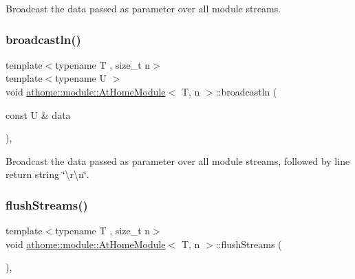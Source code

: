 Broadcast the data passed as parameter over all module streams. \mbox{\label{classathome_1_1module_1_1_at_home_module_a863a9efaa6d10169d1888278cbc70175}} 
\subsubsection{\texorpdfstring{broadcastln()}{broadcastln()}}
{\footnotesize\ttfamily template$<$typename T , size\+\_\+t n$>$ \\
template$<$typename U $>$ \\
void \mbox{\hyperlink{classathome_1_1module_1_1_at_home_module}{athome\+::module\+::\+At\+Home\+Module}}$<$ T, n $>$\+::broadcastln (\begin{DoxyParamCaption}\item[{const U \&}]{data }\end{DoxyParamCaption})\hspace{0.3cm}{\ttfamily [inline]}, {\ttfamily [protected]}}

Broadcast the data passed as parameter over all module streams, followed by line return string \char`\"{}\textbackslash{}r\textbackslash{}n\char`\"{}. \mbox{\label{classathome_1_1module_1_1_at_home_module_ad6e64ed8ff0c2daf0e8bb935b0a8e127}} 
\subsubsection{\texorpdfstring{flush\+Streams()}{flushStreams()}}
{\footnotesize\ttfamily template$<$typename T , size\+\_\+t n$>$ \\
void \mbox{\hyperlink{classathome_1_1module_1_1_at_home_module}{athome\+::module\+::\+At\+Home\+Module}}$<$ T, n $>$\+::flush\+Streams (\begin{DoxyParamCaption}{ }\end{DoxyParamCaption})\hspace{0.3cm}{\ttfamily [inline]}, {\ttfamily [protected]}}

